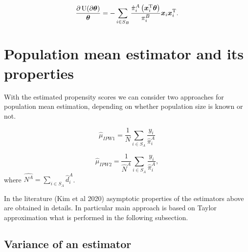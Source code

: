 \documentclass[
  letterpaper,
  DIV=11,
  numbers=noendperiod]{scrreprt}
\begin{document}
\[
    \frac{\partial \operatorname{U}(\partial \boldsymbol{\theta})}{\boldsymbol{\theta}} = - \sum_{i \in S_B} \frac{\dot{\pi}_i^A\left(\boldsymbol{x}_i^{\mathrm{T}} \boldsymbol{\theta} \right)}{\pi_i^B} \boldsymbol{x}_i \boldsymbol{x}_i^{\mathrm{T}}.
\]

\hypertarget{population-mean-estimator-and-its-properties}{%
\section{Population mean estimator and its
properties}\label{population-mean-estimator-and-its-properties}}

With the estimated propensity scores we can consider two approaches for
population mean estimation, depending on whether population size is
known or not.

\[
\begin{equation*}
    \hat{\mu}_{IPW1} = \frac{1}{N} \sum_{i \in S_A} \frac{y_i}{\hat{\pi}_i^{A}}
\end{equation*}
\]

\[
\begin{equation*}
    \hat{\mu}_{IPW2} = \frac{1}{\hat{N}^{A}} \sum_{i \in S_A} \frac{y_i}{\hat{\pi}_i^{A}},
\end{equation*}
\] where \(\hat{N^A} = \sum_{i \in S_A} \hat{d}_i^A\).

In the literature (Kim et al 2020) asymptotic properties of the
estimators above are obtained in details. In particular main approach is
based on Taylor approximation what is performed in the following
subsection.

\hypertarget{variance-of-an-estimator}{%
\subsection{Variance of an estimator}\label{variance-of-an-estimator}}
\end{document}
